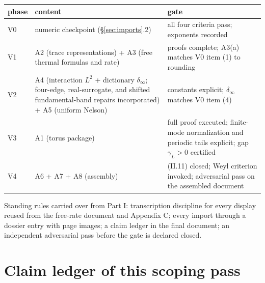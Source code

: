 \documentclass[11pt,a4paper]{article}
\theoremstyle{plain}
\theoremstyle{definition}
\begin{document}
\begin{center}
\begin{tabular}{P{1.6cm}P{6.6cm}P{5.6cm}}
\toprule
phase & content & gate \\
\midrule
V0 & numeric checkpoint (\S\ref{sec:imports}.2) & all four criteria pass; exponents
recorded \\
V1 & A2 (trace representations) + A3 (free thermal formulas and rate) & proofs
complete; A3(a) matches V0 item (1) to rounding \\
V2 & A4 (interaction $L^2$ + dictionary $\delta_\infty$; four-edge,
real-surrogate, and shifted fundamental-band repairs incorporated) + A5 (uniform Nelson) &
constants explicit; $\delta_\infty$ matches V0 item (4) \\
V3 & A1 (torus package) & full proof executed; finite-mode normalization and
periodic tails explicit; gap $\gamma_L>0$ certified \\
V4 & A6 + A7 + A8 (assembly) & (II.11) closed; Weyl criterion invoked; adversarial
pass on the assembled document \\
\bottomrule
\end{tabular}
\end{center}

Standing rules carried over from Part I: transcription discipline for every display
reused from the free-rate document and Appendix C; every import through a dossier
entry with page images; a claim ledger in the final document; an independent
adversarial pass before the gate is declared closed.

\section{Claim ledger of this scoping pass}
\end{document}
